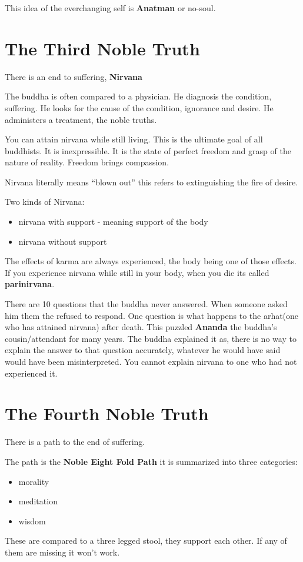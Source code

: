 \documentclass{article}
\begin{document}
This idea of the everchanging self is \textbf{Anatman} or no-soul.

\section*{The Third Noble Truth}
\label{sec:the_third_noble_truth}
There is an end to suffering, \textbf{Nirvana}

The buddha is often compared to a physician. He diagnosis the condition, suffering. He looks for the cause of the condition, ignorance and desire. He administers a treatment, the noble truths.

You can attain nirvana while still living. This is the ultimate goal of all buddhists. It is inexpressible. It is the state of perfect freedom and grasp of the nature of reality. Freedom brings compassion.

Nirvana literally means ``blown out'' this refers to extinguishing the fire of desire.

Two kinds of Nirvana:
\begin{itemize}
	\item nirvana with support - meaning support of the body
	\item nirvana without support
\end{itemize}

The effects of karma are always experienced, the body being one of those effects. If you experience nirvana while still in your body, when you die its called \textbf{parinirvana}.

There are 10 questions that the buddha never answered. When someone asked him them the refused to respond. One question is what happens to the arhat(one who has attained nirvana) after death. This puzzled \textbf{Ananda} the buddha's cousin/attendant for many years. The buddha explained it as, there is no way to explain the answer to that question accurately, whatever he would have said would have been misinterpreted. You cannot explain nirvana to one who had not experienced it.

\section*{The Fourth Noble Truth}
\label{sec:the_fourth_noble_truth}
There is a path to the end of suffering.

The path is the \textbf{Noble Eight Fold Path} it is summarized into three categories:
\begin{itemize}
	\item morality
	\item meditation
	\item wisdom
\end{itemize}
These are compared to a three legged stool, they support each other. If any of them are missing it won't work.
\end{document}
